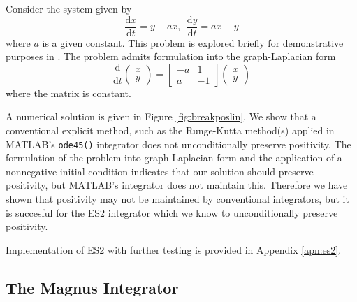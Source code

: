 Consider the system given by
\begin{equation}
    \frac{\mathrm{d}x}{\mathrm{d}t} = y - ax,~~ \frac{\mathrm{d}y}{\mathrm{d}t} = ax - y
    \label{eqn:alineartestproblem}
\end{equation}
where $a$ is a given constant. This problem is explored briefly for demonstrative purposes in \cite{broekhuizen_biochem_2008}.
The problem admits formulation into the graph-Laplacian form
\begin{equation*}
    \frac{\mathrm{d}}{\mathrm{d}t}\begin{pmatrix}
        x \\
        y
    \end{pmatrix} = \begin{bmatrix}
        -a & 1 \\
        a & -1
    \end{bmatrix} \begin{pmatrix}
        x \\
        y
    \end{pmatrix}
\end{equation*}
where the matrix is constant.

A numerical solution is given in Figure \ref{fig:breakposlin}.
We show that a conventional explicit method, such as the Runge-Kutta method(s) applied in MATLAB's \texttt{ode45()} integrator does not unconditionally preserve positivity.
The formulation of the problem into graph-Laplacian form and the application of a nonnegative initial condition indicates that our solution should preserve positivity, but MATLAB's integrator does not maintain this.
Therefore we have shown that positivity may not be maintained by conventional integrators,
but it is succesful for the ES2 integrator which we know to unconditionally preserve positivity.

Implementation of ES2 with further testing is provided in Appendix \ref{apn:es2}.

\subsection{The Magnus Integrator}

